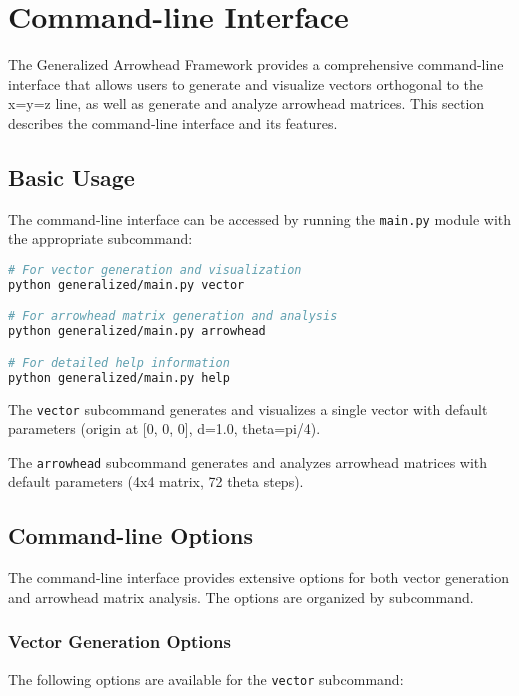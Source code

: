 \newpage
\section{Command-line Interface}

The Generalized Arrowhead Framework provides a comprehensive command-line interface that allows users to generate and visualize vectors orthogonal to the x=y=z line, as well as generate and analyze arrowhead matrices. This section describes the command-line interface and its features.

\subsection{Basic Usage}

The command-line interface can be accessed by running the \texttt{main.py} module with the appropriate subcommand:

\begin{lstlisting}[language=bash]
# For vector generation and visualization
python generalized/main.py vector

# For arrowhead matrix generation and analysis
python generalized/main.py arrowhead

# For detailed help information
python generalized/main.py help
\end{lstlisting}

The \texttt{vector} subcommand generates and visualizes a single vector with default parameters (origin at [0, 0, 0], d=1.0, theta=pi/4).

The \texttt{arrowhead} subcommand generates and analyzes arrowhead matrices with default parameters (4x4 matrix, 72 theta steps).

\subsection{Command-line Options}

The command-line interface provides extensive options for both vector generation and arrowhead matrix analysis. The options are organized by subcommand.

\subsubsection{Vector Generation Options}

The following options are available for the \texttt{vector} subcommand:

